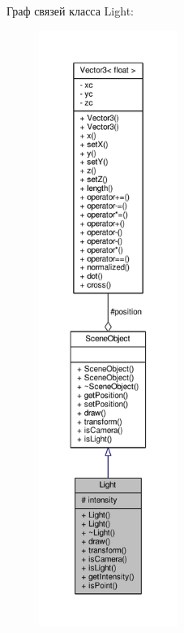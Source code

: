 Граф связей класса Light\+:
\nopagebreak
\begin{figure}[H]
\begin{center}
\leavevmode
\includegraphics[height=550pt]{df/d88/class_light__coll__graph}
\end{center}
\end{figure}
